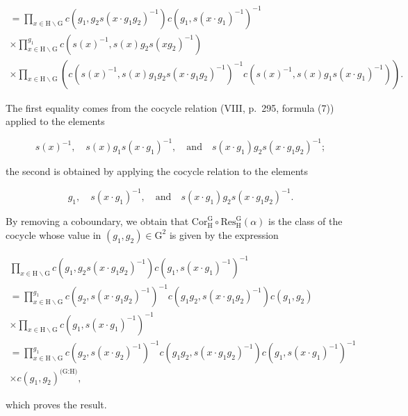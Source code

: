 \[
\begin{array}{l} = \prod_ {x \in \mathrm{H} \backslash \mathrm{G}} c (g _ {1}, g _ {2} s (x \cdot g _ {1} g _ {2}) ^ {- 1}) c (g _ {1}, s (x \cdot g _ {1}) ^ {- 1}) ^ {- 1} \\ \times \prod_ {x \in \mathrm{H} \backslash \mathrm{G}} ^ {g _ {1}} c (s (x) ^ {- 1}, s (x) g _ {2} s (x g _ {2}) ^ {- 1}) \\ \times \prod_ {x \in \mathrm{H} \backslash \mathrm{G}} \left(c (s (x) ^ {- 1}, s (x) g _ {1} g _ {2} s (x \cdot g _ {1} g _ {2}) ^ {- 1}) ^ {- 1} c (s (x) ^ {- 1}, s (x) g _ {1} s (x \cdot g _ {1}) ^ {- 1})\right). \end{array}
\]

The first equality comes from the cocycle relation (VIII, p.~295, formula (7)) applied to the elements

\[
s (x) ^ {- 1}, \quad s (x) g _ {1} s (x \cdot g _ {1}) ^ {- 1}, \quad \mathrm{and} \quad s (x \cdot g _ {1}) g _ {2} s (x \cdot g _ {1} g _ {2}) ^ {- 1};
\]

the second is obtained by applying the cocycle relation to the elements

\[
g _ {1}, \quad s (x \cdot g _ {1}) ^ {- 1}, \quad \mathrm{and} \quad s (x \cdot g _ {1}) g _ {2} s (x \cdot g _ {1} g _ {2}) ^ {- 1}.
\]

By removing a coboundary, we obtain that \(\mathrm{Cor}_{\mathrm{H}}^{\mathrm{G}} \circ \mathrm{Res}_{\mathrm{H}}^{\mathrm{G}}(\alpha)\) is the class of the cocycle whose value in \((g_{1}, g_{2}) \in \mathrm{G}^{2}\) is given by the expression

\[
\begin{array}{l} \prod_ {x \in \mathrm{H} \backslash \mathrm{G}} c (g _ {1}, g _ {2} s (x \cdot g _ {1} g _ {2}) ^ {- 1}) c (g _ {1}, s (x \cdot g _ {1}) ^ {- 1}) ^ {- 1} \\ = \prod_ {x \in \mathrm{H} \backslash \mathrm{G}} ^ {g _ {1}} c (g _ {2}, s (x \cdot g _ {1} g _ {2}) ^ {- 1}) ^ {- 1} c (g _ {1} g _ {2}, s (x \cdot g _ {1} g _ {2}) ^ {- 1}) c (g _ {1}, g _ {2}) \\ \times \prod_ {x \in \mathrm{H} \backslash \mathrm{G}} c (g _ {1}, s (x \cdot g _ {1}) ^ {- 1}) ^ {- 1} \\ = \prod_ {x \in \mathrm{H} \backslash \mathrm{G}} ^ {g _ {1}} c (g _ {2}, s (x \cdot g _ {2}) ^ {- 1}) ^ {- 1} c (g _ {1} g _ {2}, s (x \cdot g _ {1} g _ {2}) ^ {- 1}) c (g _ {1}, s (x \cdot g _ {1}) ^ {- 1}) ^ {- 1} \\ \times c (g _ {1}, g _ {2}) ^ {\text {(G:H)}}, \end{array}
\]

which proves the result.


